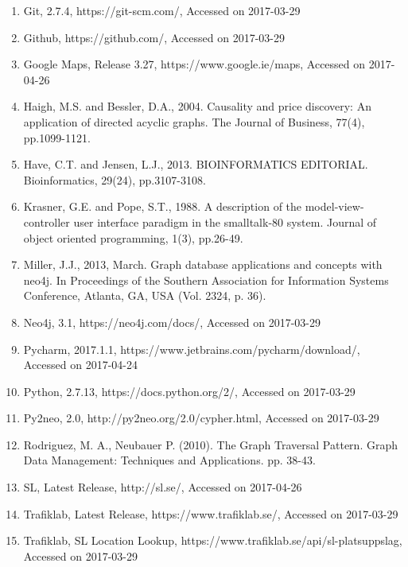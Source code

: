 \documentclass[12pt]{article}   	%
\begin{document}
\begin{enumerate}
\item
Git, 2.7.4, https://git-scm.com/, Accessed on 2017-03-29

\item
Github, https://github.com/, Accessed on 2017-03-29

\item
Google Maps, Release 3.27, https://www.google.ie/maps, Accessed on 2017-04-26

\item
Haigh, M.S. and Bessler, D.A., 2004. Causality and price discovery: An application of directed acyclic graphs. The Journal of Business, 77(4), pp.1099-1121.

\item
Have, C.T. and Jensen, L.J., 2013. BIOINFORMATICS EDITORIAL. Bioinformatics, 29(24), pp.3107-3108.

\item
Krasner, G.E. and Pope, S.T., 1988. A description of the model-view-controller user interface paradigm in the smalltalk-80 system. Journal of object oriented programming, 1(3), pp.26-49.

\item
Miller, J.J., 2013, March. Graph database applications and concepts with neo4j. In Proceedings of the Southern Association for Information Systems Conference, Atlanta, GA, USA (Vol. 2324, p. 36).

\item
Neo4j, 3.1, https://neo4j.com/docs/, Accessed on 2017-03-29

\item
Pycharm, 2017.1.1, https://www.jetbrains.com/pycharm/download/, Accessed on 2017-04-24

\item
Python, 2.7.13, https://docs.python.org/2/, Accessed on 2017-03-29

\item
Py2neo, 2.0, http://py2neo.org/2.0/cypher.html, Accessed on 2017-03-29

\item
Rodriguez, M. A., Neubauer P. (2010). The Graph Traversal Pattern. Graph Data Management: Techniques and Applications. pp. 38-43.

\item
SL, Latest Release, http://sl.se/, Accessed on 2017-04-26

\item
Trafiklab, Latest Release, https://www.trafiklab.se/, Accessed on 2017-03-29

\item
Trafiklab, SL Location Lookup, https://www.trafiklab.se/api/sl-platsuppslag, Accessed on 2017-03-29


\end{enumerate}
\end{document}
